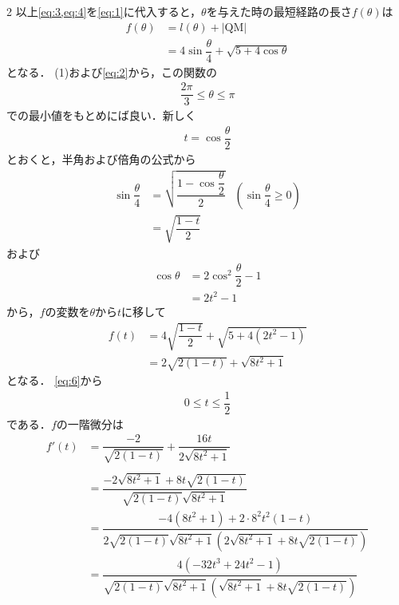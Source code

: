 \documentclass[../../main.tex]{subfiles}
\begin{document}
\begin{multicols}{2}
  以上\cref{eq:3,eq:4}を\cref{eq:1}に代入すると，$\theta$を与えた時の最短経路の長さ$f(\theta)$は
  \begin{align}
    f(\theta)
    & = l(\theta) + |\text{QM}|                                          \\
    & = 4\sin\dfrac{\theta}{4} + \sqrt{5+4\cos\theta} \label{eq:5}
  \end{align}
  となる．
  (1)および\cref{eq:2}から，この関数の
  \begin{align}
    \dfrac{2\pi}{3} \le \theta \le \pi \label{eq:6}
  \end{align}
  での最小値をもとめにば良い．新しく
  \begin{align}
    t=\cos\dfrac{\theta}{2}
  \end{align}
  とおくと，半角および倍角の公式から
  \begin{align}
    \sin\dfrac{\theta}{4}
    & = \sqrt{\dfrac{1-\cos\dfrac{\theta}{2}}{2}} & \left(\sin\dfrac{\theta}{4}\ge 0\right) \\
    & = \sqrt{\dfrac{1-t}{2}}
  \end{align}
  および
  \begin{align}
    \cos\theta
    & = 2\cos^2\dfrac{\theta}{2} - 1 \\
    & = 2t^2-1
  \end{align}
  から，$f$の変数を$\theta$から$t$に移して
  \begin{align}
    f(t)
    & = 4\sqrt{\dfrac{1-t}{2}} + \sqrt{5+4(2t^2-1)} \nonumber \\
    & = 2\sqrt{2(1-t)} + \sqrt{8t^2+1} \label{eq:7}
  \end{align}
  となる．
  \cref{eq:6}から
  \begin{align}
    0\le t \le \dfrac{1}{2} \label{eq:8}
  \end{align}
  である．$f$の一階微分は
  \begin{align}
    f'(t)
    & = \dfrac{-2}{\sqrt{2(1-t)}} + \dfrac{16t}{2\sqrt{8t^2+1}}                                                            \\                                      \\
    & = \dfrac{-2\sqrt{8t^2+1} + 8t\sqrt{2(1-t)}}{\sqrt{2(1-t)}\sqrt{8t^2+1}}                                             \\
    & = \dfrac{-4(8t^2+1) + 2\cdot 8^2t^2(1-t)}{2\sqrt{2(1-t)}\sqrt{8t^2+1}\left(2\sqrt{8t^2+1} + 8t\sqrt{2(1-t)}\right)} \\
    & = \dfrac{4(-32t^3 + 24t^2-1)}{\sqrt{2(1-t)}\sqrt{8t^2+1}\left(\sqrt{8t^2+1} + 8t\sqrt{2(1-t)}\right)}

\end{align}
\end{multicols}
\end{document}
